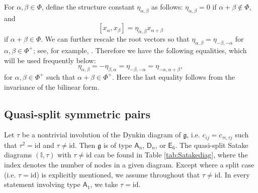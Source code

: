 \documentclass[11pt,reqno]{amsart}
\numberwithin{equation}{section}
\theoremstyle{definition}
\theoremstyle{remark}
\newcommand{\beq}{\begin{equation}}
\newcommand{\eeq}{\end{equation}}
\newcommand{\g}{\mathfrak{g}}
\newcommand{\id}{{\mathrm{id}}}
\newcommand{\I}{{\mathbb I}}
\begin{document}
For $\alpha,\beta\in\Phi$, define the structure constant $\eta_{\alpha,\beta}$ as follows: $\eta_{\alpha,\beta}=0$ if $\alpha+\beta\notin\Phi$, and
\[
[x_{\alpha},x_\beta]=\eta_{\alpha,\beta}x_{\alpha+\beta}
\]
if $\alpha+\beta\in \Phi$. We can further rescale the root vectors so that $\eta_{\alpha,\beta}=\eta_{-\beta,-\alpha}$ for $\alpha,\beta\in\Phi^+$; see, for example, \cite[\S25.2]{Hum72}. Therefore we have the following equalities, which will be used frequently below:
\beq\label{eta}
\eta_{\alpha,\beta}=-\eta_{\beta,\alpha}=\eta_{-\beta,-\alpha}=\eta_{-\alpha,\alpha+\beta},
\eeq
for $\alpha,\beta\in\Phi^+$ such that $\alpha+\beta\in\Phi^+$. Here the last equality follows from the invariance of the bilinear form.

\subsection{Quasi-split symmetric pairs}
Let $\tau$ be a nontrivial involution of the Dynkin diagram of $\g$, i.e. $c_{ij}=c_{\tau i,\tau j}$ such that $\tau^2=\mathrm{id}$ and $\tau\ne\id$. Then $\g$ is of type $\mathsf{A}_n$, $\mathsf{D}_n$, or $\mathsf{E}_6$. The quasi-split Satake diagrams $(\I,\tau)$ with $\tau \neq \id$ can be found in Table \ref{tab:Satakediag}, where the index denotes the number of nodes in a given diagram. Except where a split case (i.e. $\tau=\mathrm{id}$) is explicitly mentioned, we assume
throughout that $\tau\ne\id$. In every statement involving type
$\mathsf A_1$, we take $\tau=\id$.
\end{document}
